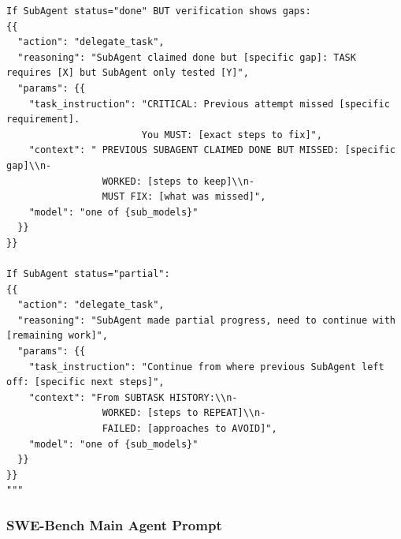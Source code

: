 \begin{tcolorbox}
\begin{verbatim}
If SubAgent status="done" BUT verification shows gaps:
{{
  "action": "delegate_task",
  "reasoning": "SubAgent claimed done but [specific gap]: TASK requires [X] but SubAgent only tested [Y]",
  "params": {{
    "task_instruction": "CRITICAL: Previous attempt missed [specific requirement]. 
                        You MUST: [exact steps to fix]",
    "context": " PREVIOUS SUBAGENT CLAIMED DONE BUT MISSED: [specific gap]\\n- 
                 WORKED: [steps to keep]\\n- 
                 MUST FIX: [what was missed]",
    "model": "one of {sub_models}"
  }}
}}

If SubAgent status="partial":
{{
  "action": "delegate_task",
  "reasoning": "SubAgent made partial progress, need to continue with [remaining work]",
  "params": {{
    "task_instruction": "Continue from where previous SubAgent left off: [specific next steps]",
    "context": "From SUBTASK HISTORY:\\n- 
                 WORKED: [steps to REPEAT]\\n- 
                 FAILED: [approaches to AVOID]",
    "model": "one of {sub_models}"
  }}
}}
"""
\end{verbatim}
\end{tcolorbox}



\subsubsection{SWE-Bench Main Agent Prompt}
\label{app:B1_swe}

